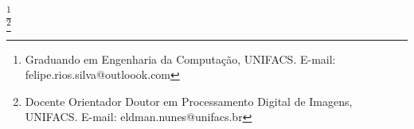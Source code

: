 \documentclass[
	article,			    %
	12pt,				    %
	oneside,			    %
	a4paper,			    %
	chapter=TITLE,		    %
	section=TITLE,		    %
	subsection=TITLE,	    %
	english,			    %
	brazil,				    %
	sumario=tradicional
]{abntex2}
\begin{document}
\frenchspacing 
\pretextual
\pagestyle{fancy}
\begin{SingleSpace}
    \begin{center}
        \imprimirtitulo
    \end{center}
    \begin{flushright}
        \imprimirautor
        \footnote{Graduando em Engenharia da Computação, UNIFACS. E-mail: felipe.rios.silva@outloook.com}
        \\
        \imprimirorientador
        \footnote{Docente Orientador Doutor em Processamento Digital de Imagens, UNIFACS. E-mail: eldman.nunes@unifacs.br}
    \end{flushright}
\end{SingleSpace}
\end{document}

